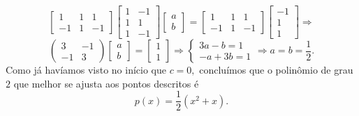 \documentclass[11pt,a4paper]{article}
\begin{document}
{\[\begin{bmatrix}
1 & 1 & 1 \\
-1 & 1 & -1
\end{bmatrix} \begin{bmatrix}
1 & -1 \\
1 & 1 \\
1 & -1 
\end{bmatrix} \begin{bmatrix}
a \\ 
b
\end{bmatrix} = \begin{bmatrix}
1 & 1 & 1 \\
-1 & 1 & -1
\end{bmatrix}\begin{bmatrix}
-1 \\
1 \\
1
\end{bmatrix} \Rightarrow \]\[ \left(\begin{matrix}
3 & -1 \\
-1 & 3
\end{matrix}\right) \begin{bmatrix}
a \\ 
b
\end{bmatrix} = \begin{bmatrix}
1 \\ 
1
\end{bmatrix} \Rightarrow \begin{cases}
3a - b = 1 \\
-a + 3b = 1
\end{cases} \Rightarrow a = b = \frac{1}{2}.
\]
Como já havíamos visto no início que $c = 0,$ concluímos que o polinômio de grau $2$ que melhor se ajusta aos pontos descritos é
\[
p(x) = \frac{1}{2}(x^2 + x).
\]
}
\end{document}
